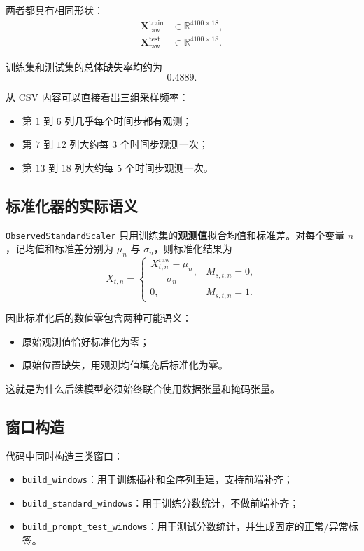 \documentclass[UTF8]{ctexart}
\newcommand{\code}[1]{\texttt{#1}}
\begin{document}
两者都具有相同形状：
\begin{align}
    \bm{X}^{\text{train}}_{\text{raw}} &\in \mathbb{R}^{4100 \times 18}, \\
    \bm{X}^{\text{test}}_{\text{raw}} &\in \mathbb{R}^{4100 \times 18}.
\end{align}

训练集和测试集的总体缺失率均约为
\begin{equation}
    0.4889.
\end{equation}

从 CSV 内容可以直接看出三组采样频率：
\begin{itemize}
    \item 第 \(1\) 到 \(6\) 列几乎每个时间步都有观测；
    \item 第 \(7\) 到 \(12\) 列大约每 \(3\) 个时间步观测一次；
    \item 第 \(13\) 到 \(18\) 列大约每 \(5\) 个时间步观测一次。
\end{itemize}

\subsection{标准化器的实际语义}

\code{ObservedStandardScaler} 只用训练集的\textbf{观测值}拟合均值和标准差。对每个变量 \(n\)，记均值和标准差分别为 \(\mu_n\) 与 \(\sigma_n\)，则标准化结果为
\begin{equation}
    X_{t,n} =
    \begin{cases}
        \dfrac{X^{\text{raw}}_{t,n} - \mu_n}{\sigma_n}, & M_{s,t,n}=0, \\[6pt]
        0, & M_{s,t,n}=1.
    \end{cases}
\end{equation}

因此标准化后的数值零包含两种可能语义：
\begin{itemize}
    \item 原始观测值恰好标准化为零；
    \item 原始位置缺失，用观测均值填充后标准化为零。
\end{itemize}

这就是为什么后续模型必须始终联合使用数据张量和掩码张量。

\subsection{窗口构造}

代码中同时构造三类窗口：
\begin{itemize}
    \item \code{build\_windows}：用于训练插补和全序列重建，支持前端补齐；
    \item \code{build\_standard\_windows}：用于训练分数统计，不做前端补齐；
    \item \code{build\_prompt\_test\_windows}：用于测试分数统计，并生成固定的正常/异常标签。
\end{itemize}
\end{document}
